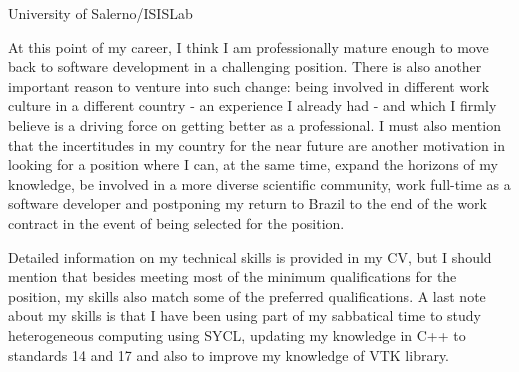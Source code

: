 \documentclass[11pt]{letter}
\begin{document}
\begin{letter}{University of Salerno/ISISLab}
  

  

  
  At this point of my career, I think I am professionally mature enough to move back to software development in a challenging position. There is also another important reason to venture into such change: being involved in different work culture in a different country - an experience I already had - and which I firmly believe is a driving force on getting better as a professional. I must also mention that the incertitudes in my country for the near future are another motivation in looking for a position where I can, at the same time, expand the horizons of my knowledge, be involved in a more diverse scientific community, work full-time as a software developer and postponing my return to Brazil to the end of the work contract in the event of being selected for the position.

  Detailed information on my technical skills is provided in my CV, but I should mention that besides meeting most of the minimum qualifications for the position, my skills also match some of the preferred qualifications. A last note about my skills is that I have been using part of my sabbatical time to study heterogeneous computing using SYCL, updating my knowledge in C++ to standards 14 and 17 and also to improve my knowledge of VTK library. 


\end{letter}
\end{document}

